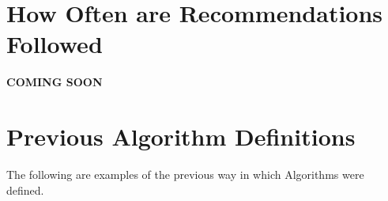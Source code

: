 \documentclass{article}
\begin{document}
\section{How Often are Recommendations Followed}
\textbf{COMING SOON}

\section*{Previous Algorithm Definitions}
The following are examples of the previous way in which Algorithms were defined.






\end{document}

